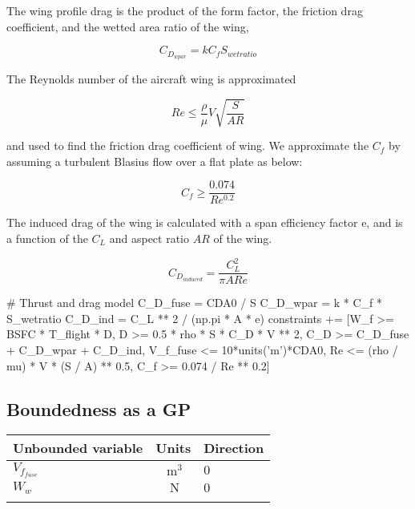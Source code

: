 The wing profile drag is the product of the form factor, the friction drag coefficient,
and the wetted area ratio of the wing,

\begin{equation}
    C_{D_{wpar}} = k C_f S_{wetratio}
\label{e:cdwpar}
\end{equation}

The Reynolds number of the aircraft wing is approximated

\begin{equation}
    Re \leq \frac{\rho}{\mu} V \sqrt{\frac{S}{AR}}
\label{e:re}
\end{equation}

and used to find the friction drag coefficient of wing. We approximate the $C_f$ by assuming a turbulent Blasius flow over a flat plate as below:

\begin{equation}
    C_f \geq \frac{0.074} {Re^{0.2}}
\end{equation}

The induced drag of the wing is calculated with a span efficiency factor e, and is a function of the $C_L$ and aspect ratio $AR$ of the wing.

\begin{equation}
    C_{D_{induced}} = \frac{C_L^2}{\pi AR e}
\label{e:cdinduced}
\end{equation}

\begin{python}
        # Thrust and drag model
        C_D_fuse = CDA0 / S
        C_D_wpar = k * C_f * S_wetratio
        C_D_ind  = C_L ** 2 / (np.pi * A * e)
        constraints += [W_f >= BSFC * T_flight * D,
                    D >= 0.5 * rho * S * C_D * V ** 2,
                    C_D >= C_D_fuse + C_D_wpar + C_D_ind,
                    V_f_fuse <= 10*units('m')*CDA0,
                    Re <= (rho / mu) * V * (S / A) ** 0.5,
                    C_f >= 0.074 / Re ** 0.2]
\end{python}

\subsection{Boundedness as a GP}

\begin{footnotesize}
\begin{table}
\begin{tabular}{ l c l }
    \toprule
	Unbounded variable & Units & Direction \\
    \midrule
    $V_{f_{fuse}}$ &  $~\mathrm{m^3}$  & $0$ \\
    $W_w$ & $~\mathrm{N}$  & $0$ \\
    \bottomrule
\label{tab:WLTD_unbounded}
\end{tabular}
\end{table} \end{footnotesize}

